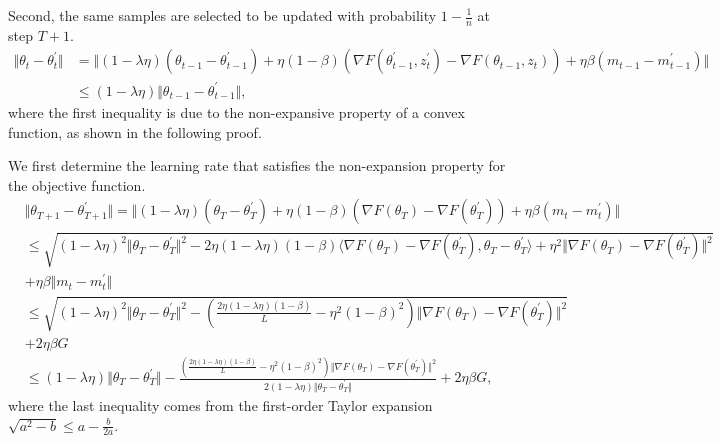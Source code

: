 Second, the same samples are selected to be updated with probability $1-\frac{1}{n}$ at step $T+1$. 
 \begin{equation}
  \begin{aligned}
   \Vert \theta_t \!-\! \theta_t^{\prime} \Vert \! &=\! \Vert \! (1-\lambda \eta) (\theta_{t-1} - \theta_{t-1}^{\prime}) \!+\! \eta (1 \!-\! \beta)(\nabla F(\theta_{t-1}^{\prime},z_{t}^{\prime}) \!-\! \nabla F(\theta_{t-1},z_{t})) \!+\! \eta \beta(m_{t-1} \!-\! m_{t-1}^{\prime})\!\Vert\\
    &\leq (1-\lambda \eta)\Vert\theta_{t-1} - \theta_{t-1}^{\prime}\Vert,
  \end{aligned}
 \end{equation}
where the first inequality is due to the non-expansive property of a convex function, as shown in the following proof.

We first determine the learning rate that satisfies the non-expansion property for the objective function.
\begin{equation}\label{eq:app2.3}
     \begin{aligned}
      &\Vert \theta_{T+1} - \theta_{T+1}^{\prime}\Vert = \Vert (1-\lambda\eta)(\theta_{T}-\theta_{T}^{\prime}) + \eta(1-\beta) (\nabla F(\theta_{T})-\nabla F(\theta_{T}^{\prime}))
      +\eta\beta(m_t-m_t^{\prime})\Vert  \\
      &\leq \!\!\sqrt{\!(1\!-\!\lambda\eta)^2\Vert \theta_{T} \!-\! \theta_{T}^{\prime} \Vert^2 \!-\! 2\eta (1\!-\!\lambda\eta)(1\!-\!\beta)\langle \nabla F(\theta_{T}) \!-\!\!\nabla F(\theta_{T}^{\prime}), \theta_T \!-\! \theta_T^{\prime} \rangle \!+\!\eta^2 \Vert \nabla F(\theta_{T}) \!-\!\! \nabla F(\theta_{T}^{\prime})\Vert^2}\\& + \eta\beta\Vert m_t-m_t^{\prime}\Vert\\
      &\leq \sqrt{(1-\lambda\eta)^2\Vert \theta_T- \theta_T^{\prime}\Vert^2 - \left(\frac{2\eta (1-\lambda\eta)(1-\beta)}{L} -\eta^2(1-\beta)^2 \right) \Vert \nabla F(\theta_{T}) -\nabla F(\theta_{T}^{\prime})\Vert^2} \\
      &+ 2\eta\beta G \\
      &\leq (1-\lambda\eta)\Vert \theta_T- \theta_T^{\prime}\Vert - \frac{\left(\frac{2\eta (1-\lambda\eta)(1-\beta)}{L} -\eta^2(1-\beta)^2 \right) \Vert \nabla F(\theta_{T}) -\nabla F(\theta_{T}^{\prime})\Vert^2}{2(1-\lambda\eta)\Vert \theta_T- \theta_T^{\prime}\Vert} + 2\eta\beta G,
     \end{aligned}
\end{equation}
where the last inequality comes from the first-order Taylor expansion $\sqrt{a^2-b}\leq a-\frac{b}{2a}$. 

